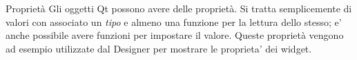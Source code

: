 \documentclass{beamer}
\begin{document}
\begin{frame}{Proprietà}
	Gli oggetti Qt possono avere delle proprietà. Si tratta semplicemente di valori con associato un \textit{tipo} e almeno una funzione per la lettura dello stesso; e' anche possibile avere funzioni per impostare il valore. Queste proprietà vengono ad esempio utilizzate dal Designer per mostrare le proprieta' dei widget.
\end{frame}
\end{document}
